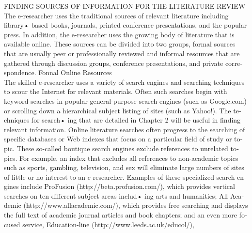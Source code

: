 \documentclass[a4 paper,12pt]{article}\usepackage{xepersian}
\begin{document}
\begin{latin}
\noindent
FINDING SOURCES OF INFORMATION FOR THE LITERATURE  REVIEW\\
The e-researcher uses the traditional  sources of relevant  literature including  library• based  books, journals, printed conference presentations, and  the  popular  press. In addition,  the e-researcher uses the growing body of literature that is available online. These sources can be divided into two groups, formal sources that are usually peer or professionally reviewed and informal  resources  that are gathered through  discussion groups, conference presentations, and private correspondence.
Fonnal Online  Resources\\
\noindent
The skilled e-researcher uses a variety of search engines and searching techniques  to scour  the  Internet for relevant  materials.  Often  such  searches begin  with  keyword searches in popular  general-purpose search engines (such as Google.com)  or scrolling down a hierarchical subject listing of sites (such as Yahoo!). The techniques  for search• ing that are detailed in Chapter 2 will be useful in finding relevant information.
Online literature searches often progress to  the searching of specific databases or Web indexes that focus on a particular field of study or topic. These so-called boutique search engines  exclude  references to  unrelated topics. For  example,  an index  that excludes all references to non-academic topics such as sports, gambling, television, and sex will eliminate large numbers of sites of little  or no  interest to an e-researcher. Examples  of  these  specialized  search  engines  include  ProFusion  (http://beta.profusion.com/), which provides vertical searches on ten different subject areas includ• ing arts and humanities; All Academic (http://www.allacademic.com/), which provides free searching and displays the full text of academic journal  articles and book chapters; and an even more  focused  service,  Education-line (http://www.leeds.ac.uk/educol/), 



\end{latin}
\noindent
\end{document}
